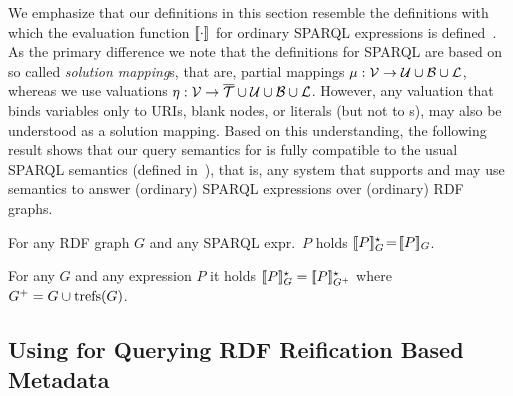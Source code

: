 \noindent
% 
We emphasize that our definitions in this section resemble the definitions with which
the evaluation function $[\![\cdot]\!]_{ }$ for ordinary SPARQL
	expressions is defined~\cite{Perez09:SemanticsAndComplexityOfSPARQL}.
As the primary difference we note that the definitions for SPARQL are based on so called \emph{solution mapping}s, that are, partial mappings $\mu : \mathcal{V} \rightarrow \mathcal{U} \cup \mathcal{B} \cup \mathcal{L}$, whereas we use valuations $\eta : \mathcal{V} \rightarrow \overline{\mathcal{T}} \cup \mathcal{U} \cup \mathcal{B} \cup \mathcal{L}$. However, any valuation
	that binds variables only to URIs, blank nodes, or literals (but not to {\RDFplusTriple}s),
may also be understood as a solution mapping. Based on this understanding, the following result shows that our query semantics for {\SPARQLplus} is fully compatible to the usual SPARQL semantics (defined in~\cite{Perez09:SemanticsAndComplexityOfSPARQL}), that is, any system that supports {\RDFplus} and {\SPARQLplus} may use {\SPARQLplus} semantics to answer (ordinary) SPARQL expressions over (ordinary) RDF graphs.

\begin{proposition} \label{Proposition:EquivalenceOfSemantics}
	For any
	RDF graph $G$ and any
	SPARQL
		expr.~$P$
	holds $[\![P]\!]^\star_{G} \!=\! [\![P]\!]_{G}$.
\end{proposition}


\begin{proposition} \label{Proposition:JustificationForDataMinimality2}
	For any {\RDFplusGraph} $G$ and any {\SPARQLplus} expression $P$ it holds $[\![P]\!]^\star_{G} = [\![P]\!]^\star_{G^+}$ where $G^+ = G \cup \mathrm{trefs}(G)$.
\end{proposition}



\subsection{Using {\SPARQLplus} for Querying RDF Reification Based Metadata}

